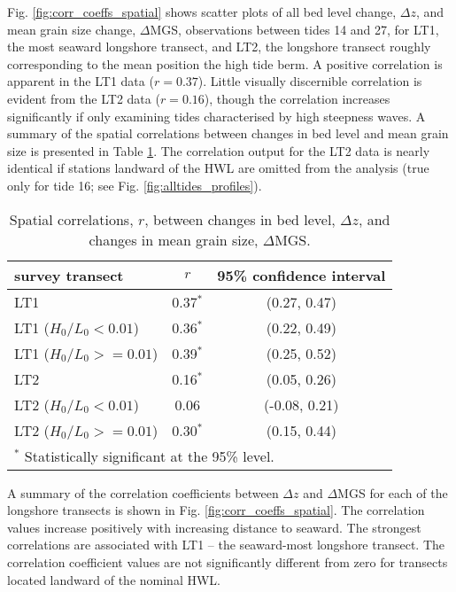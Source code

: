 Fig. \ref{fig:corr_coeffs_spatial} shows scatter plots of all bed level change, $\Delta z$, and mean grain size change, $\Delta$MGS, observations between tides 14 and 27, for LT1, the most seaward longshore transect, and LT2, the longshore transect roughly corresponding to the mean position the high tide berm. A positive correlation is apparent in the LT1 data ($r=0.37$). Little visually discernible correlation is evident from the LT2 data ($r=0.16$), though the correlation increases significantly if only examining tides characterised by high steepness waves. A summary of the spatial correlations between changes in bed level and mean grain size is presented in Table \ref{table:spatial_correlations}. The correlation output for the LT2 data is nearly identical if stations landward of the HWL are omitted from the analysis (true only for tide 16; see Fig. \ref{fig:alltides_profiles}).

\begin{table}[tbp!]
	\caption[Spatial correlations between changes in bed level and changes in mean grain size]{Spatial correlations, $r$, between changes in bed level, $\Delta z$, and changes in mean grain size, $\Delta$MGS.} 
	\label{table:spatial_correlations}
	\centering
	\begin{tabular}{lcc}
		\hline
		survey transect & $r$ & 95\% confidence interval\\
		\hline
		LT1 & 0.37$^{*}$ & (0.27, 0.47)\\
		LT1 ($H_0/L_0 < 0.01$) & 0.36$^{*}$ & (0.22, 0.49)\\
		LT1 ($H_0/L_0 >= 0.01$) & 0.39$^{*}$ & (0.25, 0.52)\\
		LT2 & 0.16$^{*}$ & (0.05, 0.26)\\
		LT2 ($H_0/L_0 < 0.01$) & 0.06 & (-0.08, 0.21)\\
		LT2 ($H_0/L_0 >= 0.01$) & 0.30$^{*}$ & (0.15, 0.44)\\
		\hline
		\multicolumn{3}{l}{$^{*}$ Statistically significant at the 95\% level.}
	\end{tabular}
\end{table}

A summary of the correlation coefficients between $\Delta z$ and $\Delta$MGS for each of the longshore transects is shown in Fig. \ref{fig:corr_coeffs_spatial}. The correlation values increase positively with increasing distance to seaward. The strongest correlations are associated with LT1 -- the seaward-most longshore transect. The correlation coefficient values are not significantly different from zero for transects located landward of the nominal HWL.

